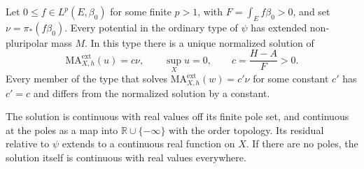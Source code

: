 \begin{theorem}\label{thm:unibranch-torus-curve-equation}
Let $0\leq f\in L^p(E,\beta_0)$ for some finite $p>1$, with $F=\int_Ef\beta_0>0$, and set $\nu=\pi_*(f\beta_0)$. Every potential in the ordinary type of $\psi$ has extended non-pluripolar mass $M$. In this type there is a unique normalized solution of
\[
 \mathrm{MA}^{\mathrm{ext}}_{X,h}(u)=c\nu,
 \qquad \sup_Xu=0,
 \qquad c=\frac{H-A}{F}>0.
\]
Every member of the type that solves $\mathrm{MA}^{\mathrm{ext}}_{X,h}(w)=c'\nu$ for some constant $c'$ has $c'=c$ and differs from the normalized solution by a constant.

The solution is continuous with real values off its finite pole set, and continuous at the poles as a map into $\mathbb R\cup\{-\infty\}$ with the order topology. Its residual relative to $\psi$ extends to a continuous real function on $X$. If there are no poles, the solution itself is continuous with real values everywhere.
\end{theorem}
